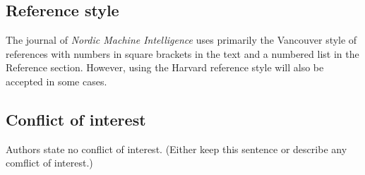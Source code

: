 \documentclass{elbioimp2}
\begin{document}
\subsection{Reference style}
The journal of \emph{Nordic Machine Intelligence} uses primarily the Vancouver
style of references with numbers in square brackets in the text and a
numbered list in the Reference section.\cite{biomed-req} However, using the
Harvard reference style will also be accepted in some cases.

\subsection{Conflict of interest}
Authors state no conflict of interest. (Either keep this sentence or
describe any comflict of interest.)

\newpage
\nocite{*}
\printbibliography
\end{document}
